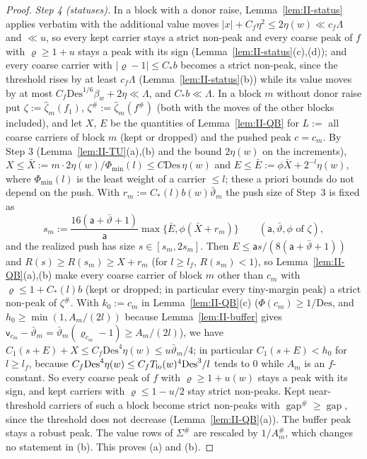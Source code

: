 \documentclass[10pt]{amsart}
\theoremstyle{definition}
\theoremstyle{remark}
\newcommand{\gap}{\operatorname{gap}}
\begin{document}
\begin{proof}
\emph{Step 4 (statuses).}  In a block with a donor raise,
Lemma~\ref{lem:II-status} applies verbatim with the additional value moves
$|x|+C_f\eta^2\le2\eta(w)\ll c_f\Lambda$ and $\ll u$, so every kept carrier
stays a strict non-peak and every coarse peak of $f$ with $\varrho\ge1+u$
stays a peak with its sign (Lemma~\ref{lem:II-status}(c),(d)); and every
coarse carrier with $|\varrho-1|\le C_*b$ becomes a strict non-peak, since
the threshold rises by at least $c_f\Lambda$ (Lemma~\ref{lem:II-status}(b))
while its value moves by at most $C_f\mathrm{Des}^{1/6}\beta_w+2\eta\ll
\Lambda$, and $C_*b\ll\Lambda$.  In a block $m$ without donor raise put
$\zeta:=\hat
\zeta_m(f_1)$, $\zeta^\#:=\hat\zeta_m(f^\#)$ (both with the moves of the other
blocks included), and let $X$, $E$ be the quantities of Lemma~\ref{lem:II-QB}
for $L:=$ all coarse carriers of block $m$ (kept or dropped) and the
pushed peak $c=c_m$.  By Step 3 (Lemma~\ref{lem:II-TU}(a),(b) and the
bound $2\eta(w)$ on the increments), $X\le\bar X:=m\cdot2\eta(w)/
\Phi_{\min}(l)\le C\mathrm{Des}\,\eta(w)$ and $E\le\bar E:=\phi\bar X+
2^{-l}\eta(w)$, where $\Phi_{\min}(l)$ is the least weight of a carrier
$\le l$; these a priori bounds do not depend on the push.  With $r_m:=
C_*(l)b(w)\bar\vartheta_m$ the push size of Step~3 is fixed as
\[
 s_m:=\frac{16(\mathsf a+\bar\vartheta+1)}{\mathsf a}\max\{\bar E,\phi(\bar
 X+r_m)\}\qquad(\mathsf a,\bar\vartheta,\phi\text{ of }\zeta),
\]
and the realized push has size $s\in[s_m,2s_m]$.  Then $E\le\mathsf a s/
(8(\mathsf a+\bar\vartheta+1))$ and $R(s)\ge R(s_m)\ge X+r_m$ (for $l\ge l_f$,
$R(s_m)<1$), so Lemma~\ref{lem:II-QB}(a),(b) make every coarse carrier of
block $m$ other than $c_m$ with $\varrho\le1+C_*(l)b$ (kept or dropped; in
particular every tiny-margin peak) a strict non-peak of $\zeta^\#$.  With
$k_0:=c_m$ in Lemma~\ref{lem:II-QB}(c) ($\Phi(c_m)\ge1/\mathrm{Des}$, and
$h_0\ge\min(1,A_m/(2l))$ because Lemma~\ref{lem:II-buffer} gives $\mathsf
v_{c_m}-\bar\vartheta_m=\bar\vartheta_m(\varrho_{c_m}-1)\ge A_m/(2l)$), we
have $C_1(s+E)+X\le C_f\mathrm{Des}^4\eta(w)\le u\bar\vartheta_m/4$; in
particular $C_1(s+E)<h_0$ for $l\ge l_f$, because $C_f\mathrm{Des}^4\eta(w)
\le C_fT_{\rm lo}(w)^4\mathrm{Des}^3/l$ tends to $0$ while $A_m$ is an
$f$-constant.  So every coarse peak of $f$ with $\varrho\ge1+u(w)$ stays a
peak with its sign, and kept carriers with $\varrho\le1-u/2$ stay strict
non-peaks.  Kept near-threshold carriers of such a block become strict
non-peaks with $\gap^\#\ge\gap$, since the threshold does not decrease
(Lemma~\ref{lem:II-QB}(a)).  The buffer peak stays
a robust peak.  The value rows of $\Sigma^\#$ are rescaled by $1/A^\#_m$,
which changes no statement in (b).  This proves (a) and (b).


\end{proof}
\end{document}

